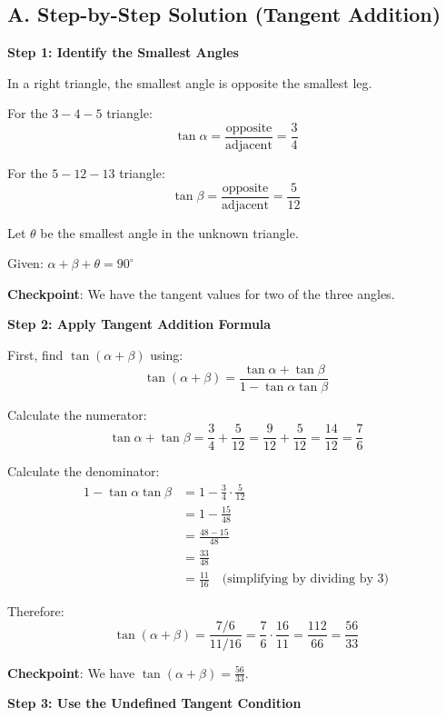\documentclass[12pt]{article}
\begin{document}
\begin{solutionbox}
\subsection*{A. Step-by-Step Solution (Tangent Addition)}

\textbf{Step 1: Identify the Smallest Angles}

In a right triangle, the smallest angle is opposite the smallest leg.

For the $3-4-5$ triangle:
$$\tan\alpha = \frac{\text{opposite}}{\text{adjacent}} = \frac{3}{4}$$

For the $5-12-13$ triangle:
$$\tan\beta = \frac{\text{opposite}}{\text{adjacent}} = \frac{5}{12}$$

Let $\theta$ be the smallest angle in the unknown triangle.

Given: $\alpha + \beta + \theta = 90^{\circ}$

\textbf{Checkpoint}: We have the tangent values for two of the three angles.

\vspace{0.3cm}

\textbf{Step 2: Apply Tangent Addition Formula}

First, find $\tan(\alpha + \beta)$ using:
$$\tan(\alpha + \beta) = \frac{\tan\alpha + \tan\beta}{1 - \tan\alpha \tan\beta}$$

Calculate the numerator:
$$\tan\alpha + \tan\beta = \frac{3}{4} + \frac{5}{12} = \frac{9}{12} + \frac{5}{12} = \frac{14}{12} = \frac{7}{6}$$

Calculate the denominator:
\begin{align*}
    1 - \tan\alpha \tan\beta &= 1 - \frac{3}{4} \cdot \frac{5}{12} \\
    &= 1 - \frac{15}{48} \\
    &= \frac{48 - 15}{48} \\
    &= \frac{33}{48} \\
    &= \frac{11}{16} \quad \text{(simplifying by dividing by 3)}
\end{align*}

Therefore:
$$\tan(\alpha + \beta) = \frac{7/6}{11/16} = \frac{7}{6} \cdot \frac{16}{11} = \frac{112}{66} = \frac{56}{33}$$

\textbf{Checkpoint}: We have $\tan(\alpha + \beta) = \frac{56}{33}$.

\vspace{0.3cm}

\textbf{Step 3: Use the Undefined Tangent Condition}


\end{solutionbox}
\end{document}
